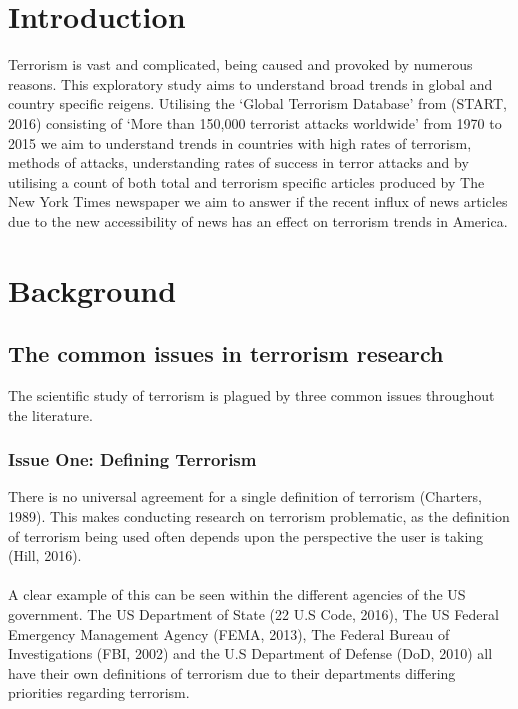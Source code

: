 \documentclass[10pt,a4paper]{article}
\begin{document}
\section{Introduction} 
Terrorism is vast and complicated, being caused and provoked by numerous reasons.  This exploratory study aims to understand broad trends in global and country specific reigens. Utilising the ‘Global Terrorism Database’ from (START, 2016) consisting of ‘More than 150,000 terrorist attacks worldwide’ from 1970 to 2015 we aim to understand trends in countries with high rates of terrorism, methods of attacks, understanding rates of success in terror attacks and by utilising a count of both total and terrorism specific  articles produced by The New York Times newspaper we aim to answer if the recent influx of news articles due to the new accessibility of news has an effect on terrorism trends in America.

\pagebreak


	\section{Background}
		\subsection{The common issues in terrorism research}
The scientific study of terrorism is plagued by three common issues throughout the literature.
			\subsubsection{Issue One: Defining Terrorism}
There is no universal agreement for a single definition of terrorism (Charters, 1989). This makes conducting research on terrorism problematic, as the definition of terrorism being used often depends upon the perspective the user is taking (Hill, 2016).   \\\\

A clear example of this can be seen within the different agencies of the US government. The US Department of State (22 U.S Code, 2016), The US Federal Emergency Management Agency (FEMA, 2013), The Federal Bureau of Investigations (FBI, 2002) and the U.S Department of Defense (DoD, 2010) all have their own definitions of terrorism due to their departments differing priorities regarding terrorism.    \\\\
\end{document}
